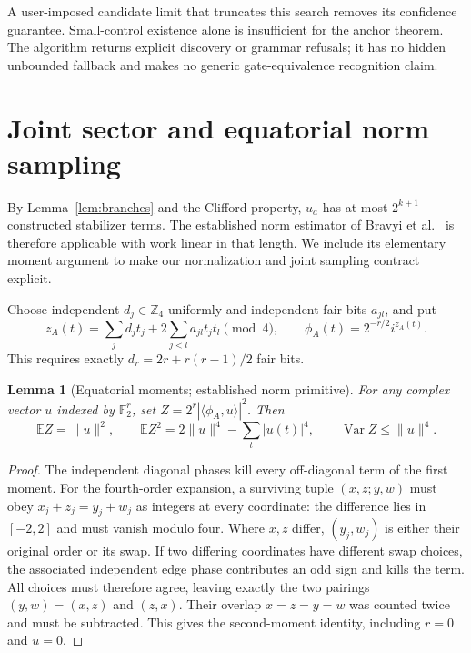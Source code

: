 \documentclass[11pt]{article}
\newtheorem{lemma}[theorem]{Lemma}
\newcommand{\F}{\mathbb F_2}
\newcommand{\E}{\mathbb E}
\newcommand{\Var}{\operatorname{Var}}
\newcommand{\norm}[1]{\lVert #1\rVert}
\begin{document}
A user-imposed candidate limit that truncates this search removes its confidence
guarantee. Small-control existence alone is insufficient for the anchor theorem.
The algorithm returns explicit discovery or grammar refusals; it has no hidden
unbounded fallback and makes no generic gate-equivalence recognition claim.

\section{Joint sector and equatorial norm sampling}\label{sec:norm}
By Lemma~\ref{lem:branches} and the Clifford property, $u_a$ has at most $2^{k+1}$
constructed stabilizer terms. The established norm estimator of
Bravyi et al.~\cite[Section 4.3]{bravyi2019} is therefore applicable with work linear
in that length. We include its elementary moment argument to make our normalization
and joint sampling contract explicit.

Choose independent $d_j\in\mathbb Z_4$ uniformly and independent fair bits $a_{jl}$,
and put
\begin{equation}\label{eq:equatorial}
 z_A(t)=\sum_j d_jt_j+2\sum_{j<l}a_{jl}t_jt_l\pmod4,\qquad
 \phi_A(t)=2^{-r/2}i^{z_A(t)}.
\end{equation}
This requires exactly $d_r=2r+r(r-1)/2$ fair bits.

\begin{lemma}[Equatorial moments; established norm primitive]\label{lem:moments}
For any complex vector $u$ indexed by $\F^r$, set
$Z=2^r|\langle\phi_A,u\rangle|^2$. Then
\[
 \E Z=\norm{u}^2,\qquad
 \E Z^2=2\norm{u}^4-\sum_t|u(t)|^4,\qquad
 \Var Z\leq\norm{u}^4.
\]
\end{lemma}
\begin{proof}
The independent diagonal phases kill every off-diagonal term of the first moment.
For the fourth-order expansion, a surviving tuple $(x,z;y,w)$ must obey
$x_j+z_j=y_j+w_j$ as integers at every coordinate: the difference lies in $[-2,2]$
and must vanish modulo four. Where $x,z$ differ, $(y_j,w_j)$ is either their original
order or its swap. If two differing coordinates have different swap choices, the
associated independent edge phase contributes an odd sign and kills the term.
All choices must therefore agree, leaving exactly the two pairings
$(y,w)=(x,z)$ and $(z,x)$. Their overlap $x=z=y=w$ was counted twice and must be
subtracted. This gives the second-moment identity, including $r=0$ and $u=0$.
\end{proof}
\end{document}

